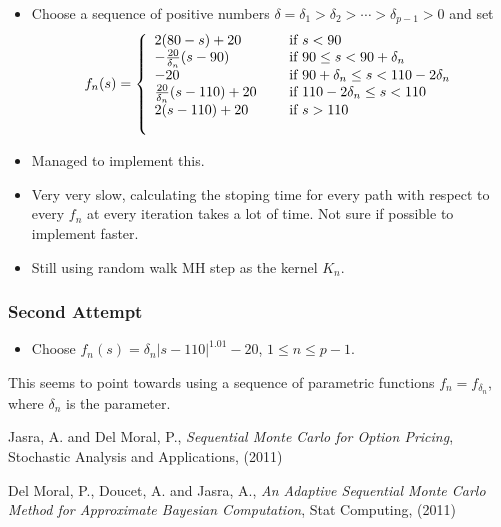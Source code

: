 \documentclass{article}
\begin{document}
\begin{itemize}
\item Choose a sequence of positive numbers $\delta = \delta_{1} > \delta_{2} > \cdots > \delta_{p-1} > 0$ and set
\[f_{n}(s) = \left\{ 
\begin{array}{l l}
2(80-s) + 20                                     & \quad \text{ if } s < 90 \\
- \frac{20}{\delta_{n}} (s-90)           & \quad \text{ if } 90 \leq s < 90 + \delta_{n} \\
-20                                                   & \quad \text{ if } 90 + \delta_{n} \leq s < 110 - 2\delta_{n} \\
\frac{20}{\delta_{n}}(s - 110) + 20  & \quad \text{ if } 110 - 2 \delta_{n} \leq s < 110 \\
2(s-110) + 20                                   & \quad \text{ if } s > 110 \\
\\
  \end{array} \right.\]

\item Managed to implement this.
\item Very very slow, calculating the stoping time for every path with respect to every $f_{n}$ at every iteration takes a lot of time. Not sure if possible to implement faster.
\item Still using random walk MH step as the kernel $K_{n}$.
\end{itemize}

\subsubsection{Second Attempt}

\begin{itemize}

\item Choose $f_{n}(s) = \delta_{n} |s-110|^{1.01} - 20$, $1 \leq n \leq p-1$.

\end{itemize}
This seems to point towards using a sequence of parametric functions $f_{n} = f_{\delta_{n}}$, where $\delta_{n}$ is the parameter.


\begin{thebibliography}{76}

  Jasra, A. and Del Moral, P.,
  \emph{Sequential Monte Carlo for Option Pricing},
  Stochastic Analysis and Applications, (2011)

  Del Moral, P., Doucet, A. and Jasra, A., 
  \emph{An Adaptive Sequential Monte Carlo Method for Approximate Bayesian Computation},
  Stat Computing, (2011)

\end{thebibliography}
\end{document}
